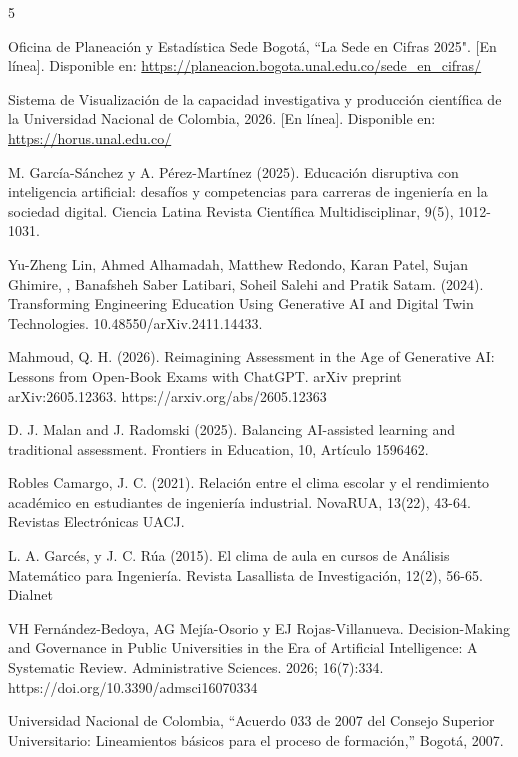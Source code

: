 \documentclass[journal,10pt,twocolumn,letterpaper]{IEEEtran}
\begin{document}

\begin{thebibliography}{5}

Oficina de Planeación y Estadística Sede Bogotá, ``La Sede en Cifras 2025". [En línea]. Disponible en: \url{https://planeacion.bogota.unal.edu.co/sede_en_cifras/}

Sistema de Visualización de la capacidad investigativa y producción científica de la Universidad Nacional de Colombia, 2026. [En línea]. Disponible en: \url{https://horus.unal.edu.co/}

M. García-Sánchez y A. Pérez-Martínez (2025). Educación disruptiva con inteligencia artificial: desafíos y competencias para carreras de ingeniería en la sociedad digital. Ciencia Latina Revista Científica Multidisciplinar, 9(5), 1012-1031. 

Yu-Zheng Lin, Ahmed Alhamadah, Matthew Redondo, Karan Patel, Sujan Ghimire, , Banafsheh Saber Latibari, Soheil Salehi and Pratik Satam. (2024). Transforming Engineering Education Using Generative AI and Digital Twin Technologies. 10.48550/arXiv.2411.14433.

Mahmoud, Q. H. (2026). Reimagining Assessment in the Age of Generative AI: Lessons from Open-Book Exams with ChatGPT. arXiv preprint arXiv:2605.12363. https://arxiv.org/abs/2605.12363

D. J. Malan and J. Radomski (2025). Balancing AI-assisted learning and traditional assessment. Frontiers in Education, 10, Artículo 1596462.

Robles Camargo, J. C. (2021). Relación entre el clima escolar y el rendimiento académico en estudiantes de ingeniería industrial. NovaRUA, 13(22), 43-64. Revistas Electrónicas UACJ.

L. A. Garcés, y J. C. Rúa (2015). El clima de aula en cursos de Análisis Matemático para Ingeniería. Revista Lasallista de Investigación, 12(2), 56-65. Dialnet


VH Fernández-Bedoya, AG Mejía-Osorio y EJ Rojas-Villanueva. Decision-Making and Governance in Public Universities in the Era of Artificial Intelligence: A Systematic Review. Administrative Sciences. 2026; 16(7):334. https://doi.org/10.3390/admsci16070334

Universidad Nacional de Colombia, ``Acuerdo 033 de 2007 del Consejo Superior Universitario: Lineamientos básicos para el proceso de formación,'' Bogotá, 2007.


\end{thebibliography}
\end{document}

